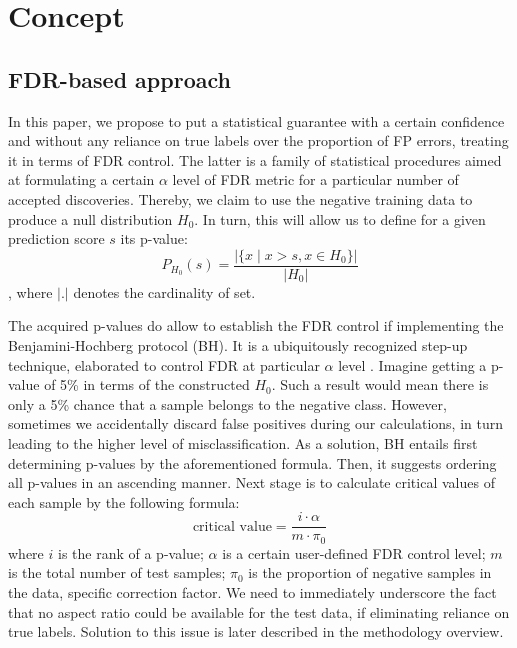 \documentclass{article}
\begin{document}
\section{Concept}

\subsection{FDR-based approach}

In this paper, we propose to put a statistical guarantee with a certain confidence and without any reliance on true labels over the proportion of FP errors, treating it in terms of FDR control. The latter is a family of statistical procedures aimed at formulating a certain $\alpha$ level of FDR metric for a particular number of accepted discoveries. Thereby, we claim to use the negative training data to produce a null distribution $H_0$. In turn, this will allow us to define for a given prediction score $s$ its p-value: 
\begin{equation}
P_{H_0}(s)=\frac{|\{x\mid x>s, x \in H_0\}|}{|H_0|}
\end{equation}
, where $|.|$ denotes the cardinality of set. 

The acquired p-values do allow to establish the FDR control if implementing the Benjamini-Hochberg protocol (BH). It is a ubiquitously recognized step-up technique, elaborated to control FDR at particular $\alpha$ level \cite{BH}. Imagine getting a p-value of 5\% in terms of the constructed $H_0$. Such a result would mean there is only a 5\% chance that a sample belongs to the negative class.  However, sometimes we accidentally discard false positives during our calculations, in turn leading to the higher level of misclassification. As a solution, BH entails first determining p-values by the aforementioned formula. Then, it suggests ordering all p-values in an ascending manner. Next stage is to calculate critical values of each sample by the following formula:
\begin{equation}\label{eq:bh}
    \text{critical value} = \frac{i \cdot \alpha}{m\cdot \pi_0}
\end{equation}
where $i$ is the rank of a p-value;  $\alpha$ is a certain user-defined FDR control level; $m$ is the total number of test samples; $\pi_0$ is the proportion of negative samples in the data, specific correction factor. We need to immediately underscore the fact that no aspect ratio could be available for the test data, if eliminating reliance on true labels. Solution to this issue is later described in the methodology overview. 
\end{document}
